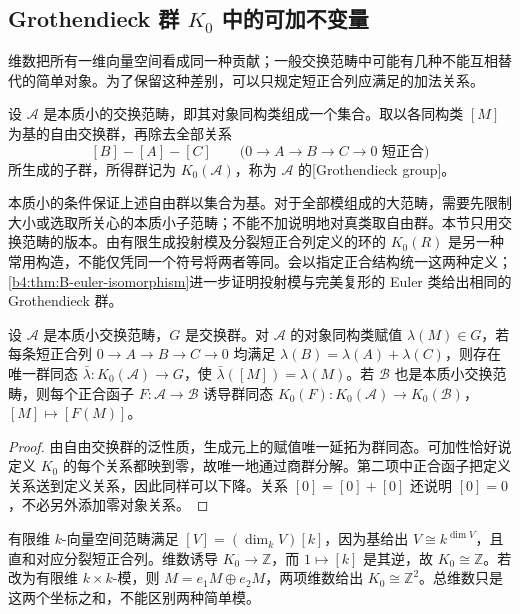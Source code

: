 \subsection{\texorpdfstring{Grothendieck 群 \(K_0\) 中的可加不变量}{Grothendieck 群 K0 中的可加不变量}}
\label{b4:subsec:0504:02}

维数把所有一维向量空间看成同一种贡献；一般交换范畴中可能有几种不能互相替代的简单对象。为了保留这种差别，可以只规定短正合列应满足的加法关系。

\begin{definition}\label{b4:def:grothendieck-group}
设 \(\mathcal A\) 是本质小的交换范畴，即其对象同构类组成一个集合。取以各同构类 \([M]\) 为基的自由交换群，再除去全部关系
\[
[B]-[A]-[C]
\qquad\bigl(0\to A\to B\to C\to0\text{ 短正合}\bigr)
\]
所生成的子群，所得群记为 \(K_0(\mathcal A)\)，称为 \(\mathcal A\) 的[Grothendieck group]。
\end{definition}

本质小的条件保证上述自由群以集合为基。对于全部模组成的大范畴，需要先限制大小或选取所关心的本质小子范畴；不能不加说明地对真类取自由群。本节只用交换范畴的版本。由有限生成投射模及分裂短正合列定义的环的 \(K_0(R)\) 是另一种常用构造，不能仅凭同一个符号将两者等同。会以指定正合结构统一这两种定义；\cref{b4:thm:B-euler-isomorphism}进一步证明投射模与完美复形的 Euler 类给出相同的 Grothendieck 群。

\begin{proposition}\label{b4:prop:grothendieck-universal}
设 \(\mathcal A\) 是本质小交换范畴，\(G\) 是交换群。对 \(\mathcal A\) 的对象同构类赋值 \(\lambda(M)\in G\)，若每条短正合列 \(0\to A\to B\to C\to0\) 均满足 \(\lambda(B)=\lambda(A)+\lambda(C)\)，则存在唯一群同态 \(\bar\lambda:K_0(\mathcal A)\to G\)，使 \(\bar\lambda([M])=\lambda(M)\)。若 \(\mathcal B\) 也是本质小交换范畴，则每个正合函子 \(F:\mathcal A\to\mathcal B\) 诱导群同态 \(K_0(F):K_0(\mathcal A)\to K_0(\mathcal B)\)，\([M]\mapsto[F(M)]\)。
\end{proposition}
\begin{proof}
由自由交换群的泛性质，生成元上的赋值唯一延拓为群同态。可加性恰好说定义 \(K_0\) 的每个关系都映到零，故唯一地通过商群分解。第二项中正合函子把定义关系送到定义关系，因此同样可以下降。关系 \([0]=[0]+[0]\) 还说明 \([0]=0\)，不必另外添加零对象关系。
\end{proof}

\begin{example}\label{b4:exm:kzero-vectors}
有限维 \(k\)-向量空间范畴满足 \([V]=(\dim_kV)[k]\)，因为基给出 \(V\cong k^{\dim V}\)，且直和对应分裂短正合列。维数诱导 \(K_0\to\mathbb Z\)，而 \(1\mapsto[k]\) 是其逆，故 \(K_0\cong\mathbb Z\)。若改为有限维 \(k\times k\)-模，则 \(M=e_1M\oplus e_2M\)，两项维数给出 \(K_0\cong\mathbb Z^2\)。总维数只是这两个坐标之和，不能区别两种简单模。
\end{example}

